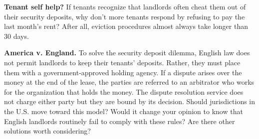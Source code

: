 
\item \textbf{Tenant self help?}  If tenants recognize that landlords often
cheat them out of their security deposits, why don't more tenants respond by
refusing to pay the last month's rent?  After all, eviction procedures almost
always take longer than 30 days.


\item \textbf{America v. England.} To solve the security deposit dilemma,
English law does not permit landlords to keep their tenants' deposits.  Rather,
they must place them with a government-approved holding agency.  If a dispute
arises over the money at the end of the lease, the parties are referred to an
arbitrator who works for the organization that holds the money.  The dispute
resolution service does not charge either party but they are bound by its
decision.  Should jurisdictions in the U.S. move toward this model?  Would it
change your opinion to know that English landlords routinely fail to comply
with these rules? Are there other solutions worth considering?  

